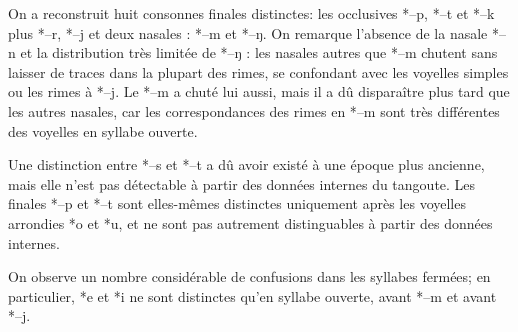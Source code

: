 \documentclass[oldfontcommands,twoside,a4paper,11pt,draft]{memoir}
\newcommand{\ipapl}[1]{{\phondroit #1}}
\begin{document}
On a reconstruit huit consonnes finales distinctes: les occlusives *\ipapl{--p},	*\ipapl{--t} et *\ipapl{--k} plus *\ipapl{--r},  *\ipapl{--j}	et deux nasales : *\ipapl{--m} et *\ipapl{--ŋ}. On remarque l'absence de la nasale *\ipapl{--n} et la distribution très limitée de *\ipapl{--ŋ} : les nasales autres que *\ipapl{--m} chutent sans laisser de traces dans la plupart des rimes, se confondant avec les voyelles simples ou les rimes à *\ipapl{--j}. Le *\ipapl{--m} a chuté lui aussi, mais il a dû disparaître plus tard que les autres nasales, car les correspondances des rimes en *\ipapl{--m} sont très différentes des voyelles en syllabe ouverte.

Une distinction entre *--s et *--t a dû avoir existé à une époque plus ancienne, mais elle n'est pas détectable à partir des données internes du tangoute. Les finales *--p et *--t sont elles-mêmes distinctes uniquement après les voyelles arrondies *o et *u, et ne sont pas autrement distinguables à partir des données internes.

On observe un nombre considérable de confusions dans les syllabes fermées; en particulier, *e et *i ne sont distinctes qu'en syllabe ouverte, avant  *\ipapl{--m} et avant  *\ipapl{--j}.
\end{document}
